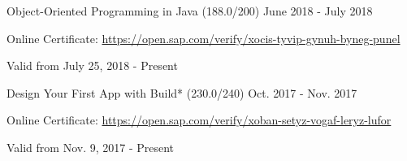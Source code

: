 \begin{cventries}
  \cventry
    {Object-Oriented Programming in Java (188.0/200)} %
    {} %
    {} %
    {June 2018 - July 2018} %
    {
	    \begin{cvitems} %
        \item[] {Online Certificate: \url{https://open.sap.com/verify/xocis-tyvip-gynuh-byneg-punel}} %
        \item[] {Valid from July 25, 2018 - Present} %
      \end{cvitems}
    }   
    \vspace{-0.1cm}
  \cventry
    {Design Your First App with Build* (230.0/240)} %
    {} %
    {} %
    {Oct. 2017 - Nov. 2017} %
    {
	    \begin{cvitems} %
        \item[] {Online Certificate: \url{https://open.sap.com/verify/xoban-setyz-vogaf-leryz-lufor}} %
        \item[] {Valid from Nov. 9, 2017 - Present} %
      \end{cvitems}
    }      

\end{cventries}

